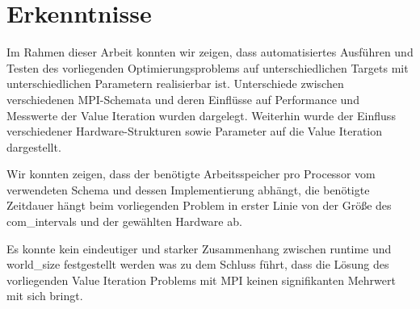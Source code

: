 \section{Erkenntnisse}
\label{sec:erkenntnisse}
Im Rahmen dieser Arbeit konnten wir zeigen, dass automatisiertes Ausführen und Testen des vorliegenden Optimierungsproblems
auf unterschiedlichen Targets mit unterschiedlichen Parametern realisierbar ist.
Unterschiede zwischen verschiedenen MPI-Schemata und deren Einflüsse auf Performance und Messwerte der Value Iteration wurden dargelegt.
Weiterhin wurde der Einfluss verschiedener Hardware-Strukturen sowie Parameter auf die Value Iteration dargestellt.

Wir konnten zeigen, dass der benötigte Arbeitsspeicher pro Processor vom verwendeten Schema und dessen Implementierung abhängt,
die benötigte Zeitdauer hängt beim vorliegenden Problem in erster Linie von der Größe des com\_intervals und der gewählten Hardware ab.

Es konnte kein eindeutiger und starker Zusammenhang zwischen runtime und world\_size festgestellt werden was zu dem Schluss führt, dass
die Lösung des vorliegenden Value Iteration Problems mit MPI keinen signifikanten Mehrwert mit sich bringt.